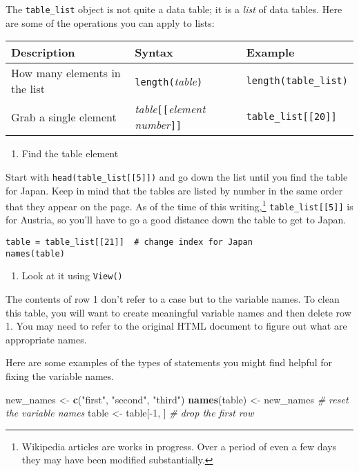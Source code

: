 \documentclass[]{tufte-handout}
\newenvironment{Shaded}{}{}
\newcommand{\KeywordTok}[1]{\textcolor[rgb]{0.00,0.44,0.13}{\textbf{{#1}}}}
\newcommand{\DecValTok}[1]{\textcolor[rgb]{0.25,0.63,0.44}{{#1}}}
\newcommand{\StringTok}[1]{\textcolor[rgb]{0.25,0.44,0.63}{{#1}}}
\newcommand{\CommentTok}[1]{\textcolor[rgb]{0.38,0.63,0.69}{\textit{{#1}}}}
\newcommand{\NormalTok}[1]{{#1}}
\providecommand{\tightlist}{%
  \setlength{\itemsep}{0pt}\setlength{\parskip}{0pt}}
\begin{document}
The \texttt{table\_list} object is not quite a data table; it is a
\emph{list} of data tables. Here are some of the operations you can
apply to lists:

\begin{longtable}[]{@{}lll@{}}
\toprule
Description & Syntax & Example\tabularnewline
\midrule
\endhead
How many elements in the list & \texttt{length(}\emph{table}\texttt{)} &
\texttt{length(table\_list)}\tabularnewline
Grab a single element & \emph{table}\texttt{{[}{[}}\emph{element
number}\texttt{{]}{]}} &
\texttt{table\_list{[}{[}20{]}{]}}\tabularnewline
\bottomrule
\end{longtable}

\begin{enumerate}
\def\labelenumi{\arabic{enumi})}
\tightlist
\item
  Find the table element
\end{enumerate}

Start with \texttt{head(table\_list{[}{[}5{]}{]})} and go down the list
until you find the table for Japan. Keep in mind that the tables are
listed by number in the same order that they appear on the page. As of
the time of this writing,\footnote{Wikipedia articles are works in
  progress. Over a period of even a few days they may have been modified
  substantially.} \texttt{table\_list{[}{[}5{]}{]}} is for Austria, so
you'll have to go a good distance down the table to get to Japan.

\begin{verbatim}
table = table_list[[21]]  # change index for Japan
names(table)
\end{verbatim}

\begin{enumerate}
\def\labelenumi{\arabic{enumi})}
\setcounter{enumi}{1}
\tightlist
\item
  Look at it using \texttt{View()}
\end{enumerate}

The contents of row 1 don't refer to a case but to the variable names.
To clean this table, you will want to create meaningful variable names
and then delete row 1. You may need to refer to the original HTML
document to figure out what are appropriate names.

Here are some examples of the types of statements you might find helpful
for fixing the variable names.

\begin{Shaded}
\begin{Highlighting}[]
\NormalTok{new_names <-}\StringTok{ }\KeywordTok{c}\NormalTok{(}\StringTok{"first"}\NormalTok{, }\StringTok{"second"}\NormalTok{, }\StringTok{"third"}\NormalTok{)}
\KeywordTok{names}\NormalTok{(table) <-}\StringTok{ }\NormalTok{new_names }\CommentTok{# reset the variable names}
\NormalTok{table <-}\StringTok{ }\NormalTok{table[-}\DecValTok{1}\NormalTok{, ] }\CommentTok{# drop the first row}
\end{Highlighting}
\end{Shaded}
\end{document}
